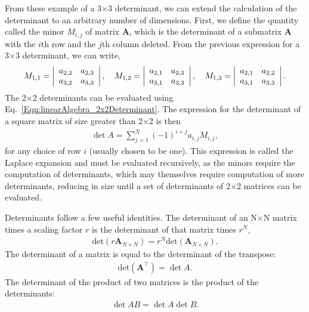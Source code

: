 From these example of a 3$\times$3 determinant, we can extend the calculation of the determinant to an arbitrary number of dimensions. First, we define the quantity called the minor $M_{i,j}$ of matrix $\mathbf{A}$, which is the determinant of a submatrix $\mathbf{A}$ with the $i$th row and the $j$th column deleted. From the previous expression for a 3$\times$3 determinant, we can write, 
\begin{align}
  M_{1,1} = \left| \begin{array}{c c} a_{2,2} & a_{2,3} \\ a_{3,2} & a_{3,3} \\ \end{array} \right| , \quad
  M_{1,2} = \left| \begin{array}{c c} a_{2,1} & a_{2,3} \\ a_{3,1} & a_{3,3} \\ \end{array} \right| , \quad
  M_{1,3} = \left| \begin{array}{c c} a_{2,1} & a_{2,2} \\ a_{3,1} & a_{3,3} \\ \end{array} \right| .
\end{align}
The 2$\times$2 determinants can be evaluated using Eq.~\eqref{Eqn:linearAlgebra_2x2Determinant}. The expression for the determinant of a square matrix of size greater than 2$\times$2 is then
\begin{align}
  \det{A} = \sum_{j=1}^N (-1)^{i+j} a_{i,j} M_{i,j} ,
\end{align}
for any choice of row $i$ (usually chosen to be one). This expression is called the Laplace expansion and must be evaluated recursively, as the minors require the computation of determinants, which may themselves require computation of more determinants, reducing in size until a set of determinants of 2$\times$2 matrices can be evaluated. 

Determinants follow a few useful identities. The determinant of an N$\times$N matrix times a scaling factor $r$ is the determinant of that matrix times $r^N$,
\begin{align}
  \mathrm{det}( r \mathbf{A}_{N \times N} ) = r^N \mathrm{det}( \mathbf{A}_{N \times N} ) .
\end{align}
The determinant of a matrix is equal to the determinant of the transpose:
\begin{align}
  \mathrm{det}( \mathbf{A}^\top ) = \det{ A  } .
\end{align}
The determinant of the product of two matrices is the product of the determinants:
\begin{align}
  \det{ A B } = \det{ A } \det{ B } .
\end{align}

